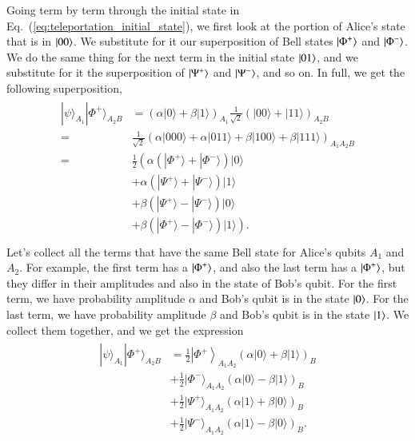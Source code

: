 Going term by term through the initial state in Eq.~(\ref{eq:teleportation_initial_state}), we first look at the portion of Alice's state that is in $\left| 00 \right\rangle$.
We substitute for it our superposition of Bell states $\left| \Phi^+ \right\rangle$ and $\left| \Phi^- \right\rangle$.
We do the same thing for the next term in the initial state $\left| 01 \right\rangle$, and we substitute for it the superposition of $\left| \Psi^+ \right\rangle$ and $\left| \Psi^- \right\rangle$, and so on.
In full, we get the following superposition,
\begin{align}
    \begin{aligned}
        |\psi\rangle_{A_{1}}|\Phi^{+}\rangle_{A_{2} B} & = (\alpha|0\rangle+\beta|1\rangle)_{A_{1}} \frac{1}{\sqrt{2}}(|00\rangle+|11\rangle)_{A_{2} B} \\
        = & \frac{1}{\sqrt{2}}(\alpha|000\rangle+\alpha|011\rangle+\beta|100\rangle+\beta|111\rangle)_{A_{1} A_{2} B} \\
        = & \frac{1}{2}\left( \alpha\left(|\Phi^{+}\rangle+|\Phi^{-}\rangle\right)|0\rangle\right.\\
        & + \alpha\left(|\Psi^{+}\rangle+|\Psi^{-}\rangle\right)|1\rangle \\
        & + \beta\left(|\Psi^{+}\rangle-|\Psi^{-}\rangle\right)|0\rangle \\
        & \left. +\beta\left(|\Phi^{+}\rangle-|\Phi^{-}\rangle\right)|1\rangle\right). \\
\end{aligned}
\end{align}
Let's collect all the terms that have the same Bell state for Alice's qubits $A_1$ and $A_2$.
For example, the first term has a $\left| \Phi^+ \right\rangle$, and also the last term has a $\left| \Phi^+ \right\rangle$, but they differ in their amplitudes and also in the state of Bob's qubit.
For the first term, we have probability amplitude $\alpha$ and Bob's qubit is  in the state $\left| 0 \right\rangle$.
For the last term, we have probability amplitude $\beta$ and Bob's qubit is in the state $\left| 1 \right\rangle$.
We collect them together, and we get the expression
\begin{align}
\begin{aligned}
    |\psi\rangle_{A_{1}}|\Phi^{+}\rangle_{A_{2} B} & = \frac{1}{2}\left|\Phi^{+}\right\rangle_{A_{1} A_{2}}(\alpha|0\rangle+\beta|1\rangle)_{B} \\
    & + \frac{1}{2}|\Phi^{-}\rangle_{A_{1} A_{2}}(\alpha|0\rangle-\beta|1\rangle)_{B} \\
    & + \frac{1}{2}|\Psi^{+}\rangle_{A_{1} A_{2}}(\alpha|1\rangle+\beta|0\rangle)_{B} \\
    & + \frac{1}{2}|\Psi^{-}\rangle_{A_{1} A_{2}}(\alpha|1\rangle-\beta|0\rangle)_{B}.
\end{aligned}
\label{eq:teleport-alice-basis}
\end{align}

